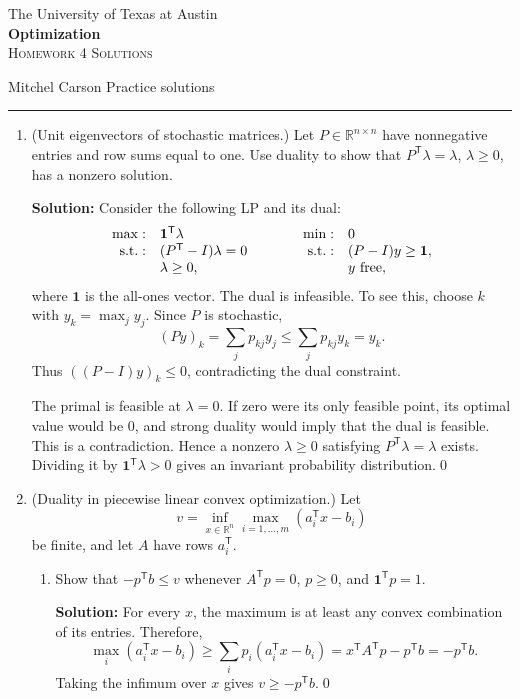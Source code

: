 \documentclass[11pt]{article}
\newcommand{\R}{\mathbb R}
\newcommand{\T}{^{\mathsf T}}
\newcommand{\ones}{\mathbf 1}
\newcommand{\solution}{\par\medskip\noindent\textbf{Solution:} }
\newcommand{\finishsolution}{\qed\par}
\begin{document}
\begin{center}
The University of Texas at Austin\\
\textbf{Optimization}\\[1em]
\textsc{Homework 4 Solutions}
\end{center}
Mitchel Carson \hfill Practice solutions
\par\smallskip\hrule\bigskip

\begin{enumerate}
\setlength{\itemsep}{1.2em}
\setlength{\parsep}{0.4em}

\item (Unit eigenvectors of stochastic matrices.) Let $P\in\R^{n\times n}$
have nonnegative entries and row sums equal to one. Use duality to show
that $P\T\lambda=\lambda$, $\lambda\ge0$, has a nonzero solution.

\solution Consider the following LP and its dual:
\[
\begin{array}{rl@{\qquad\qquad}rl}
\max:&\ones\T\lambda&\min:&0\\
\text{s.t.}:&(P\T-I)\lambda=0&\text{s.t.}:&(P-I)y\ge\ones,\\
&\lambda\ge0,&&y\text{ free},
\end{array}
\]
where $\ones$ is the all-ones vector. The dual is infeasible. To see this,
choose $k$ with $y_k=\max_jy_j$. Since $P$ is stochastic,
\[
(Py)_k=\sum_jp_{kj}y_j\le\sum_jp_{kj}y_k=y_k.
\]
Thus $((P-I)y)_k\le0$, contradicting the dual constraint.

The primal is feasible at $\lambda=0$. If zero were its only feasible
point, its optimal value would be $0$, and strong duality would imply
that the dual is feasible. This is a contradiction. Hence a nonzero
$\lambda\ge0$ satisfying $P\T\lambda=\lambda$ exists. Dividing it by
$\ones\T\lambda>0$ gives an invariant probability distribution.\finishsolution

\item (Duality in piecewise linear convex optimization.) Let
\[
v=\inf_{x\in\R^n}\max_{i=1,\ldots,m}(a_i\T x-b_i)
\]
be finite, and let $A$ have rows $a_i\T$.
\begin{enumerate}
\setlength{\itemsep}{0.8em}
\item Show that $-p\T b\le v$ whenever
$A\T p=0$, $p\ge0$, and $\ones\T p=1$.

\solution For every $x$, the maximum is at least any convex combination
of its entries. Therefore,
\[
\max_i(a_i\T x-b_i)
\ge\sum_i p_i(a_i\T x-b_i)
=x\T A\T p-p\T b=-p\T b.
\]
Taking the infimum over $x$ gives $v\ge-p\T b$.\finishsolution


\end{enumerate}
\end{enumerate}
\end{document}

